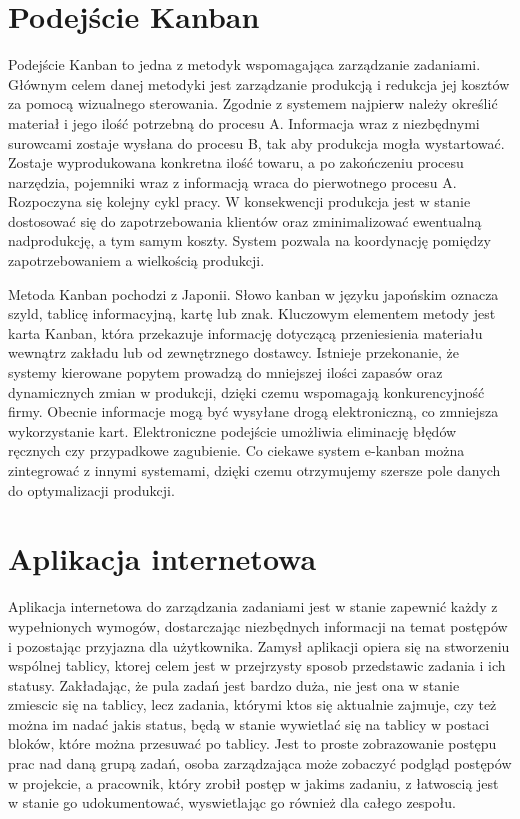 \section{Podejście Kanban}
\indent Podejście Kanban to jedna z metodyk wspomagająca zarządzanie zadaniami. Głównym celem danej metodyki  jest zarządzanie produkcją i redukcja jej kosztów za pomocą wizualnego sterowania. Zgodnie z systemem najpierw należy określić materiał i jego ilość potrzebną do procesu A. Informacja wraz z niezbędnymi surowcami zostaje wysłana do procesu B, tak aby produkcja mogła wystartować. Zostaje wyprodukowana konkretna ilość towaru, a po zakończeniu procesu narzędzia, pojemniki wraz z informacją  wraca do pierwotnego procesu A. Rozpoczyna  się kolejny cykl pracy. W konsekwencji produkcja jest w stanie dostosować się do zapotrzebowania klientów oraz zminimalizować ewentualną nadprodukcję, a tym samym koszty. System pozwala na koordynację pomiędzy zapotrzebowaniem a wielkością produkcji. 

\indent Metoda Kanban pochodzi z Japonii. Słowo kanban w języku japońskim oznacza szyld, tablicę informacyjną, kartę lub znak.  Kluczowym elementem metody jest karta Kanban, która przekazuje informację dotyczącą przeniesienia materiału wewnątrz zakładu lub od zewnętrznego dostawcy. Istnieje przekonanie, że systemy kierowane popytem prowadzą do mniejszej ilości zapasów oraz dynamicznych zmian w produkcji, dzięki czemu wspomagają konkurencyjność firmy. Obecnie informacje mogą być wysyłane drogą elektroniczną, co zmniejsza wykorzystanie kart. Elektroniczne podejście umożliwia eliminację błędów ręcznych czy przypadkowe zagubienie. Co ciekawe system e-kanban można zintegrować z innymi systemami, dzięki czemu otrzymujemy szersze pole danych do optymalizacji produkcji. 

\section{Aplikacja internetowa}

Aplikacja internetowa do zarządzania zadaniami jest w stanie zapewnić każdy z wypełnionych wymogów, dostarczając niezbędnych informacji na temat postępów i pozostając przyjazna dla użytkownika. Zamysł aplikacji opiera się na stworzeniu wspólnej tablicy, ktorej celem jest w przejrzysty sposob przedstawic zadania i ich statusy. Zakładając, że pula zadań jest bardzo duża, nie jest ona w stanie zmiescic się na tablicy, lecz zadania, którymi ktos się aktualnie zajmuje, czy też można im nadać jakis status, będą w stanie wywietlać się na tablicy w postaci bloków, które można przesuwać po tablicy. Jest to proste zobrazowanie postępu prac nad daną grupą zadań, osoba zarządzająca może zobaczyć podgląd postępów w projekcie, a pracownik, który zrobił postęp w jakims zadaniu, z łatwoscią jest w stanie go udokumentować, wyswietlając go również dla całego zespołu.


